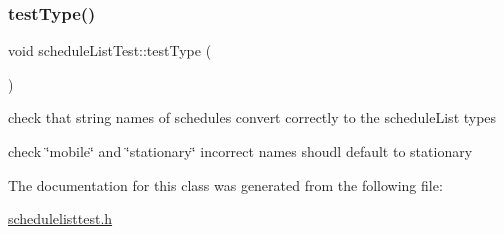 \subsubsection{\texorpdfstring{test\+Type()}{testType()}}
{\footnotesize\ttfamily void schedule\+List\+Test\+::test\+Type (\begin{DoxyParamCaption}{ }\end{DoxyParamCaption})\hspace{0.3cm}{\ttfamily [inline]}}



check that string names of schedules convert correctly to the schedule\+List types 

check \char`\"{}mobile\char`\"{} and \char`\"{}stationary\char`\"{} incorrect names shoudl default to stationary 

The documentation for this class was generated from the following file\+:\begin{DoxyCompactItemize}
\item 
\mbox{\hyperlink{schedulelisttest_8h}{schedulelisttest.\+h}}\end{DoxyCompactItemize}
